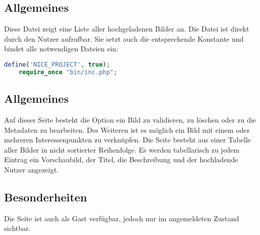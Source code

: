 \subsection{Allgemeines} Diese Datei zeigt eine Liste aller hochgeladenen Bilder an.
Die Datei ist direkt durch den Nutzer aufrufbar. Sie setzt auch die entsprechende Konstante und bindet alle notwendigen Dateien ein:
\begin{lstlisting}[language=php]
	define('NICE_PROJECT', true);
	require_once "bin/inc.php";
\end{lstlisting}
\subsection{Allgemeines}
Auf dieser Seite besteht die Option ein Bild zu validieren, zu löschen oder zu die Metadaten zu bearbeiten. Des Weiteren ist es möglich ein Bild mit einem oder mehreren Interessenpunkten zu verknüpfen. Die Seite besteht aus einer Tabelle aller Bilder in nicht sortierter Reihenfolge. Es werden tabellarisch zu jedem Eintrag ein Vorschaubild, der Titel, die Beschreibung und der hochladende Nutzer angezeigt.
\subsection{Besonderheiten}
Die Seite ist auch als Gast verfügbar, jedoch nur im angemeldeten Zustand sichtbar.